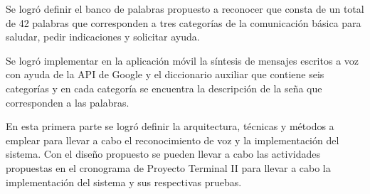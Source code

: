 Se logró definir el banco de palabras propuesto a reconocer que consta de un total de 42 palabras que corresponden a tres categorías de la comunicación básica para saludar, pedir indicaciones y solicitar ayuda.

Se logró implementar en la aplicación móvil la síntesis de mensajes escritos a voz con ayuda de la API de Google y el diccionario auxiliar que contiene seis categorías y en cada categoría se encuentra la descripción de la seña que corresponden a las palabras.

En esta primera parte se logró definir la arquitectura, técnicas y métodos a emplear para llevar a cabo el reconocimiento de voz y la implementación del sistema. Con el diseño propuesto se pueden llevar a cabo las actividades propuestas en el cronograma de Proyecto Terminal II para llevar a cabo la implementación del sistema y sus respectivas pruebas.
